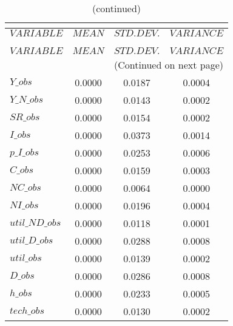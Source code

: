  
\begin{center}
\begin{longtable}{lccc} 
\caption{THEORETICAL MOMENTS}\\
 \label{Table:th_moments}\\
\toprule 
$VARIABLE       $	 & 	 $         MEAN$	 & 	 $    STD. DEV.$	 & 	 $     VARIANCE$\\
\midrule \endfirsthead 
\caption{(continued)}\\
 \toprule \\ 
$VARIABLE       $	 & 	 $         MEAN$	 & 	 $    STD. DEV.$	 & 	 $     VARIANCE$\\
\midrule \endhead 
\midrule \multicolumn{4}{r}{(Continued on next page)} \\ \bottomrule \endfoot 
\bottomrule \endlastfoot 
$Y\_obs         $	 & 	       0.0000	 & 	       0.0187	 & 	       0.0004 \\ 
$Y\_N\_obs      $	 & 	       0.0000	 & 	       0.0143	 & 	       0.0002 \\ 
$SR\_obs        $	 & 	       0.0000	 & 	       0.0154	 & 	       0.0002 \\ 
$I\_obs         $	 & 	       0.0000	 & 	       0.0373	 & 	       0.0014 \\ 
$p\_I\_obs      $	 & 	       0.0000	 & 	       0.0253	 & 	       0.0006 \\ 
$C\_obs         $	 & 	       0.0000	 & 	       0.0159	 & 	       0.0003 \\ 
$NC\_obs        $	 & 	       0.0000	 & 	       0.0064	 & 	       0.0000 \\ 
$NI\_obs        $	 & 	       0.0000	 & 	       0.0196	 & 	       0.0004 \\ 
$util\_ND\_obs  $	 & 	       0.0000	 & 	       0.0118	 & 	       0.0001 \\ 
$util\_D\_obs   $	 & 	       0.0000	 & 	       0.0288	 & 	       0.0008 \\ 
$util\_obs      $	 & 	       0.0000	 & 	       0.0139	 & 	       0.0002 \\ 
$D\_obs         $	 & 	       0.0000	 & 	       0.0286	 & 	       0.0008 \\ 
$h\_obs         $	 & 	       0.0000	 & 	       0.0233	 & 	       0.0005 \\ 
$tech\_obs      $	 & 	       0.0000	 & 	       0.0130	 & 	       0.0002 \\ 
\end{longtable}
 \end{center}
